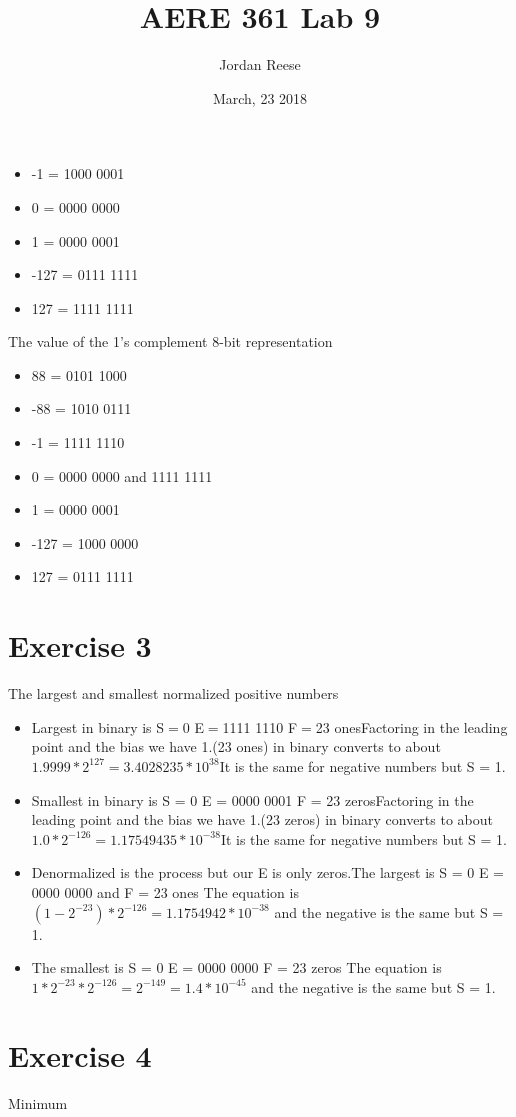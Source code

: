 \documentclass{article} \usepackage[utf8]{inputenc} \title{AERE 361 Lab 9} \author{Jordan Reese} \date{March, 23 2018} \usepackage{listings} \usepackage{color}
\begin{document}
\begin{itemize}
    \item -1 = 1000 0001
    \item 0 = 0000 0000
    \item 1 = 0000 0001
    \item -127 = 0111 1111
    \item 127 = 1111 1111 \end{itemize} The value of the 1's complement 8-bit representation \begin{itemize}
    \item 88 = 0101 1000
    \item -88 = 1010 0111
    \item -1 = 1111 1110
    \item 0 = 0000 0000 and 1111 1111
    \item 1 = 0000 0001
    \item -127 = 1000 0000
    \item 127 = 0111 1111 \end{itemize} \section{Exercise 3} The largest and smallest normalized positive numbers \begin{itemize}
    \item Largest in binary is S$=$0 E$=$1111 1110 F$=$23 ones\newline Factoring in the leading point and the bias we have 1.(23 ones) in binary converts to 
about $ 1.9999 * 2^{127} = 3.4028235 * 10^{38} $\newline It is the same for negative numbers but S = 1.
    \item Smallest in binary is S = 0 E = 0000 0001 F = 23 zeros\newline Factoring in the leading point and the bias we have 1.(23 zeros) in binary converts to 
about $1.0 * 2^{-126} = 1.17549435 * 10^{-38} $\newline It is the same for negative numbers but S = 1.\newline
    \item Denormalized is the process but our E is only zeros.\newline The largest is S = 0 E = 0000 0000 and F = 23 ones
    The equation is $(1-2^{-23}) * 2^{-126} = 1.1754942 * 10^{-38}$ and the negative is the same but S = 1.
    \item The smallest is S = 0 E = 0000 0000 F = 23 zeros\newline
    The equation is $ 1 * 2^{-23} * 2^{-126} = 2^{-149} = 1.4 * 10^{-45}$ and the negative is the same but S = 1. \end{itemize} \section*{Exercise 4} Minimum 
\end{document}
